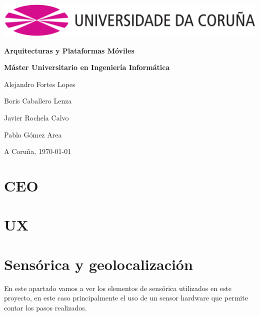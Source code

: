 \documentclass[12pt, a4paper, titlepage]{article}
\begin{document}
	\begin{titlepage}
	\includegraphics[width=15cm]{img/Simbolo_logo_UDC.png}
	\vspace{6cm}
		\begin{center}
			\Huge{\textbf{Arquitecturas y Plataformas Móviles}}

			\large{\textbf{Máster Universitario en Ingeniería Informática}}

		\end{center}
		\vspace{10cm}
		\begin{flushright}

			Alejandro Fortes Lopes

			Boris Caballero Lenza

			Javier Rochela Calvo

			Pablo Gómez Area

		\end{flushright}

		\vspace{1cm}
		\begin{flushright}
			A Coruña, \today
		\end{flushright}


	\end{titlepage}

	\clearpage

	\tableofcontents

	\clearpage

	\section{CEO}

	\clearpage

	\section{UX}

	\clearpage

    \section{Sensórica y geolocalización}
		En este apartado vamos a ver los elementos de sensórica utilizados en este proyecto, en este caso principalmente el uso de un sensor hardware que permite contar los pasos realizados.
    	\newline
\end{document}
